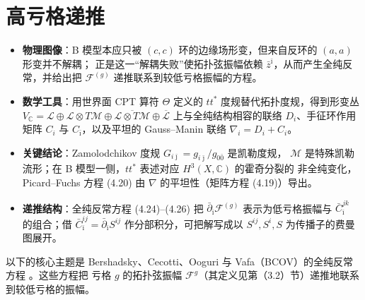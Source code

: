 

\section{高亏格递推}
\label{sec:4}

\begin{keytakeaways}
  \begin{itemize}[leftmargin=1.4em,itemsep=2pt,topsep=2pt]
    \item \textbf{物理图像}：B 模型本应只被 $(c,c)$ 环的边缘场形变，但来自反环的 $(a,a)$ 形变并不解耦；
          正是这一“解耦失败”使拓扑弦振幅依赖 $\bar z^{\bar\imath}$，从而产生全纯反常，并给出把
          $\mathcal{F}^{(g)}$ 递推联系到较低亏格振幅的方程。
    \item \textbf{数学工具}：用世界面 CPT 算符 $\Theta$ 定义的 $tt^*$ 度规替代拓扑度规，得到形变丛
          $V_{\mathbb{C}}=\mathcal{L}\oplus\mathcal{L}\otimes T\mathcal{M}
          \oplus\overline{\mathcal{L}\otimes T\mathcal{M}}\oplus\overline{\mathcal{L}}$
          上与全纯结构相容的联络 $D_i$、手征环作用矩阵 $C_i$ 与 $C_{\bar\imath}$，以及平坦的
          Gauss--Manin 联络 $\nabla_i=D_i+C_i$。
    \item \textbf{关键结论}：Zamolodchikov 度规 $G_{i\bar\jmath}=g_{i\bar\jmath}/g_{0\bar 0}$ 是凯勒度规，
          $\mathcal{M}$ 是特殊凯勒流形；在 B 模型一侧，$tt^*$ 表述对应 $H^3(X,\mathbb{C})$ 的霍奇分裂的
          非全纯变化，Picard--Fuchs 方程 (4.20) 由 $\nabla$ 的平坦性（矩阵方程 (4.19)）导出。
    \item \textbf{递推结构}：全纯反常方程 (4.24)--(4.26) 把 $\bar\partial_{\bar\imath}\mathcal{F}^{(g)}$
          表示为低亏格振幅与 $\bar C^{jk}_{\bar\imath}$ 的组合；借 $\bar C^{ij}_{\bar\imath}
          =\bar\partial_{\bar\imath}S^{ij}$ 作分部积分，可把解写成以 $S^{ij},S^i,S$ 为传播子的费曼图展开。
  \end{itemize}
\end{keytakeaways}

以下的核心主题是 Bershadsky、Cecotti、Ooguri 与 Vafa（BCOV）的全纯反常方程 \cite{ref18,ref19}。这些方程把
亏格 $g$ 的拓扑弦振幅 $\mathcal{F}^g$（其定义见第（3.2）节）递推地联系到较低亏格的振幅。


